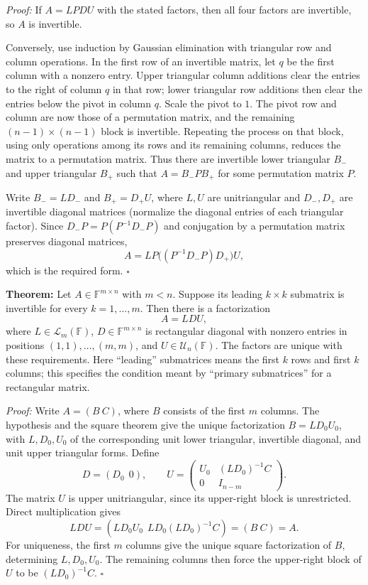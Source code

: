 \documentclass[a4paper,11pt,abstract=true]{scrartcl}
\theoremstyle{dotlessP}
\theoremstyle{dotlessS}
\theoremstyle{remark}
\theoremstyle{definition}
\begin{document}
\begin{claim_box}
\textit{Proof:} If $A=LPDU$ with the stated factors, then all four
factors are invertible, so $A$ is invertible.

Conversely, use induction by Gaussian elimination with triangular
row and column operations. In the first row of an invertible matrix,
let $q$ be the first column with a nonzero entry. Upper triangular
column additions clear the entries to the right of column $q$ in that
row; lower triangular row additions then clear the entries below the
pivot in column $q$. Scale the pivot to $1$. The pivot row and column
are now those of a permutation matrix, and the remaining
$(n-1)\times(n-1)$ block is invertible. Repeating the process on that
block, using only operations among its rows and its remaining columns,
reduces the matrix to a permutation matrix. Thus there are invertible
lower triangular $B_-$ and upper triangular $B_+$ such that
$A=B_-PB_+$ for some permutation matrix $P$.

Write $B_-=L D_-$ and $B_+=D_+U$, where $L,U$ are unitriangular and
$D_-,D_+$ are invertible diagonal matrices (normalize the diagonal
entries of each triangular factor). Since
$D_-P=P(P^{-1}D_-P)$ and conjugation by a permutation matrix preserves
diagonal matrices,
\[
A=L P\bigl((P^{-1}D_-P)D_+\bigr)U,
\]
which is the required form. \hfill$\square$
\end{claim_box}

\begin{problem_box}
\textbf{Theorem:} Let $A\in\mathbb{F}^{m\times n}$
with $m<n$. Suppose its leading $k\times k$ submatrix is invertible
for every $k=1,\ldots,m$. Then there is a factorization
\[
A=LDU,
\]
where $L\in\mathcal{L}_m(\mathbb{F})$, $D\in\mathbb{F}^{m\times n}$
is rectangular diagonal with nonzero entries in positions
$(1,1),\ldots,(m,m)$, and $U\in\mathcal{U}_n(\mathbb{F})$.
The factors are unique with these requirements. Here “leading”
submatrices means the first $k$ rows and first $k$ columns; this
specifies the condition meant by “primary submatrices” for a
rectangular matrix.
\end{problem_box}

\begin{claim_box}
\textit{Proof:} Write $A=(B\ C)$, where $B$ consists of the first
$m$ columns. The hypothesis and the square theorem give the unique
factorization $B=L D_0 U_0$, with $L,D_0,U_0$ of the corresponding
unit lower triangular, invertible diagonal, and unit upper triangular
forms. Define
\[
D=(D_0\ \ 0),\qquad
U=\begin{pmatrix}U_0&(LD_0)^{-1}C\\0&I_{n-m}\end{pmatrix}.
\]
The matrix $U$ is upper unitriangular, since its upper-right block is
unrestricted. Direct multiplication gives
\[
LDU=(LD_0U_0\ \ LD_0(LD_0)^{-1}C)=(B\ C)=A.
\]
For uniqueness, the first $m$ columns give the unique square
factorization of $B$, determining $L,D_0,U_0$. The remaining columns
then force the upper-right block of $U$ to be $(LD_0)^{-1}C$.
\hfill$\square$
\end{claim_box}
\end{document}

